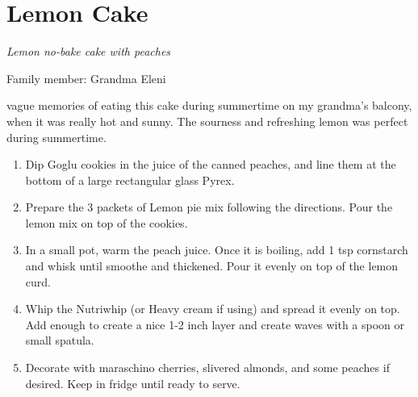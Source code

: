 \chapter{Lemon Cake}
\label{ch:Lemoncake}



\textit{Lemon no-bake cake with peaches}

Family member: Grandma Eleni

 vague memories of eating this cake during summertime on my grandma's balcony, when it was really hot and sunny. The sourness and refreshing lemon was perfect during summertime.

\begin{enumerate}
    \item Dip Goglu cookies in the juice of the canned peaches, and line them at the bottom of a large rectangular glass Pyrex.
    \item Prepare the 3 packets of Lemon pie mix following the directions. Pour the lemon mix on top of the cookies.
    \item In a small pot, warm the peach juice. Once it is boiling, add 1 tsp cornstarch and whisk until smoothe and thickened. Pour it evenly on top of the lemon curd.
    \item Whip the Nutriwhip (or Heavy cream if using) and spread it evenly on top. Add enough to create a nice 1-2 inch layer and create waves with a spoon or small spatula.
    \item Decorate with maraschino cherries, slivered almonds, and some peaches if desired. Keep in fridge until ready to serve.
\end{enumerate}

